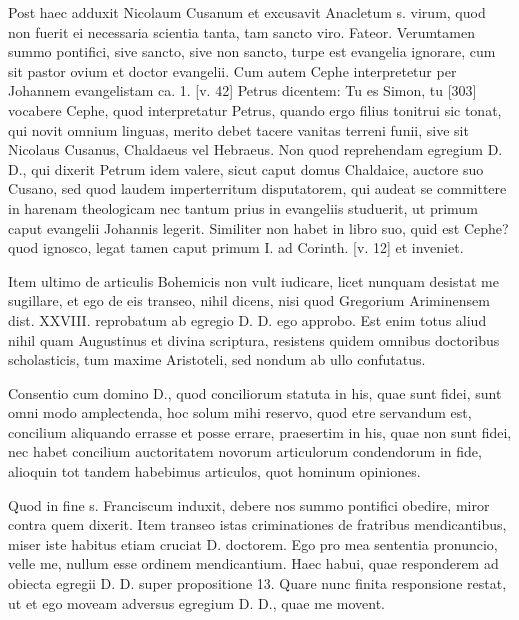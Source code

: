Post haec adduxit Nicolaum Cusanum et excusavit Anacletum s. virum, quod non fuerit ei necessaria scientia tanta, tam sancto viro. Fateor. Verumtamen summo pontifici, sive sancto, sive non sancto, turpe est evangelia ignorare, cum sit pastor ovium et doctor evangelii. Cum autem Cephe interpretetur per Johannem evangelistam ca. 1. [v. 42] Petrus dicentem: Tu es Simon, tu [303] vocabere Cephe, quod interpretatur Petrus, quando ergo filius tonitrui sic tonat, qui novit omnium linguas, merito debet tacere vanitas terreni funii, sive sit Nicolaus Cusanus, Chaldaeus vel Hebraeus. Non quod reprehendam egregium D. D., qui dixerit Petrum idem valere, sicut caput domus Chaldaice, auctore suo Cusano, sed quod laudem imperterritum disputatorem, qui audeat se committere in harenam theologicam nec tantum prius in evangeliis studuerit, ut primum caput evangelii Johannis legerit. Similiter non habet in libro suo, quid est Cephe? quod ignosco, legat tamen caput primum I. ad Corinth. [v. 12] et inveniet.

Item ultimo de articulis Bohemicis non vult iudicare, licet nunquam desistat me sugillare, et ego de eis transeo, nihil dicens, nisi quod Gregorium Ariminensem dist. XXVIII. reprobatum ab egregio D. D. ego approbo. Est enim totus aliud nihil quam Augustinus et divina scriptura, resistens quidem omnibus doctoribus scholasticis, tum maxime Aristoteli, sed nondum ab ullo confutatus.

Consentio cum domino D., quod conciliorum statuta in his, quae sunt fidei, sunt omni modo amplectenda, hoc solum mihi reservo, quod etre servandum est, concilium aliquando errasse et posse errare, praesertim in his, quae non sunt fidei, nec habet concilium auctoritatem novorum articulorum condendorum in fide, alioquin tot tandem habebimus articulos, quot hominum opiniones.

Quod in fine s. Franciscum induxit, debere nos summo pontifici obedire, miror contra quem dixerit. Item transeo istas criminationes de fratribus mendicantibus, miser iste habitus etiam cruciat D. doctorem. Ego pro mea sententia pronuncio, velle me, nullum esse ordinem mendicantium. Haec habui, quae responderem ad obiecta egregii D. D. super propositione 13. Quare nunc finita responsione restat, ut et ego moveam adversus egregium D. D., quae me movent.

